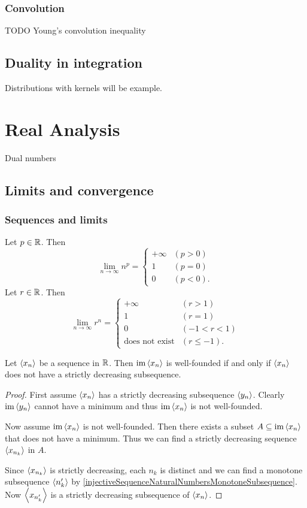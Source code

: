 \subsection{Convolution}
TODO Young's convolution inequality

\section{Duality in integration}
Distributions with kernels will be example.




\chapter{Real Analysis}
Dual numbers

\section{Limits and convergence}
\subsection{Sequences and limits}
\begin{example}
Let $p\in\mathbb{R}$. Then
\[ \lim_{n\to\infty} n^p = \begin{cases}
+\infty & (p>0) \\
1 & (p=0) \\
0 & (p<0).
\end{cases} \]
Let $r\in\mathbb{R}$. Then
\[ \lim_{n\to\infty} r^n = \begin{cases}
+\infty & (r>1) \\
1 & (r=1) \\
0 & (-1<r<1) \\
\text{does not exist} & (r\leq -1).
\end{cases} \]
\end{example}

\begin{lemma} \label{sequenceWellFoundedIffNoDecreasingSubsequence}
Let $\left\langle x_n \right\rangle$ be a sequence in $\mathbb{R}$. Then $\operatorname{im}\left\langle x_n \right\rangle$ is well-founded \textup{if and only if} $\left\langle x_n \right\rangle$ does not have a strictly decreasing subsequence.
\end{lemma}
\begin{proof}
First assume $\left\langle x_n \right\rangle$ has a strictly decreasing subsequence $\left\langle y_n \right\rangle$. Clearly $\operatorname{im}\left\langle y_n \right\rangle$ cannot have a minimum and thus $\operatorname{im}\left\langle x_n \right\rangle$ is not well-founded.

Now assume $\operatorname{im}\left\langle x_n \right\rangle$ is not well-founded. Then there exists a subset $A\subseteq \operatorname{im}\left\langle x_n \right\rangle$ that does not have a minimum. Thus we can find a strictly decreasing sequence $\left\langle x_{n_k} \right\rangle$ in $A$.

Since $\left\langle x_{n_k} \right\rangle$ is strictly decreasing, each $n_k$ is distinct and we can find a monotone subsequence $\left\langle n'_k \right\rangle$ by \ref{injectiveSequenceNaturalNumbersMonotoneSubsequence}. Now $\left\langle x_{n'_k} \right\rangle$ is a strictly decreasing subsequence of $\left\langle x_n \right\rangle$.
\end{proof}

